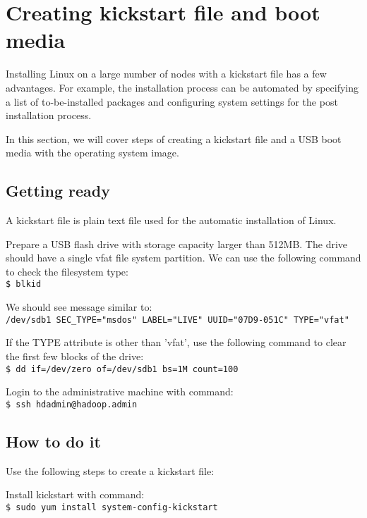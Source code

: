 \section{Creating kickstart file and boot media}
Installing Linux on a large number of nodes with a kickstart file has a few advantages. For example, the installation process can be automated by specifying a list of to-be-installed packages and configuring system settings for the post installation process.

In this section, we will cover steps of creating a kickstart file and a USB boot media with the operating system image.
\subsection*{Getting ready}
A kickstart file is plain text file used for the automatic installation of Linux.

Prepare a USB flash drive with storage capacity larger than 512MB. The drive should have a single vfat file system partition. We can use the following command to check the filesystem type: \\
\verb|$ blkid|

We should see message similar to: \\
\verb|/dev/sdb1 SEC_TYPE="msdos" LABEL="LIVE" UUID="07D9-051C" TYPE="vfat"|

If the TYPE attribute is other than 'vfat', use the following command to clear the first few blocks of the drive: \\
\verb|$ dd if=/dev/zero of=/dev/sdb1 bs=1M count=100|

Login to the administrative machine with command: \\
\verb|$ ssh hdadmin@hadoop.admin|

\subsection*{How to do it}
Use the following steps to create a kickstart file:

Install kickstart with command: \\
\verb|$ sudo yum install system-config-kickstart|

